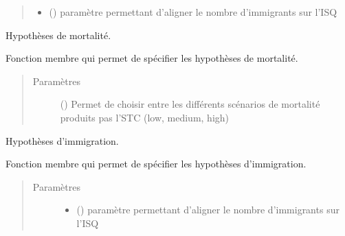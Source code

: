\documentclass[letterpaper,10pt,french]{sphinxmanual}
\begin{document}
\begin{fulllineitems}
\begin{fulllineitems}
\begin{quote}
\begin{description}
\begin{itemize}
\item {} 
 () \textendash{} paramètre permettant d’aligner le nombre d’immigrants sur l’ISQ

\end{itemize}

\end{description}\end{quote}

\end{fulllineitems}


\begin{fulllineitems}
\label{\detokenize{code:simgen.model.dead_assumptions}}
Hypothèses de mortalité.

Fonction membre qui permet de spécifier les hypothèses de mortalité.
\begin{quote}\begin{description}
\item[{Paramètres}] \leavevmode
{} () \textendash{} Permet de choisir entre les différents scénarios de mortalité produits pas l’STC (low, medium, high)

\end{description}\end{quote}

\end{fulllineitems}


\begin{fulllineitems}
\label{\detokenize{code:simgen.model.immig_assumptions}}
Hypothèses d’immigration.

Fonction membre qui permet de spécifier les hypothèses d’immigration.
\begin{quote}\begin{description}
\item[{Paramètres}] \leavevmode\begin{itemize}
\item {} 
 () \textendash{} paramètre permettant d’aligner le nombre d’immigrants sur l’ISQ


\end{itemize}
\end{description}
\end{quote}
\end{fulllineitems}
\end{fulllineitems}
\end{document}
